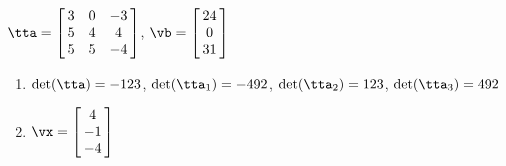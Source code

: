 {$\tta = \left[\hskip -3pt \begin{array}{ccc} 3&0&-3\\  5&4&4
\\  5&5&-4\end{array}\hskip -3pt \right]$,
 \quad
$\vb = \left[\hskip -3pt \begin{array}{c} 24\\  0\\  
31\end{array}\hskip -3pt \right] $}
{\begin{enumerate}
\item	$\det(\tta) = -123$, $\det(\tta_1) = -492$, $\det(\tta_2) = 123$, $\det(\tta_3) = 492$
\item $\vx = \left[\hskip -3pt \begin{array}{c} 4\\  -1\\  -4\end{array}\hskip -3pt \right]$
\end{enumerate}
}

